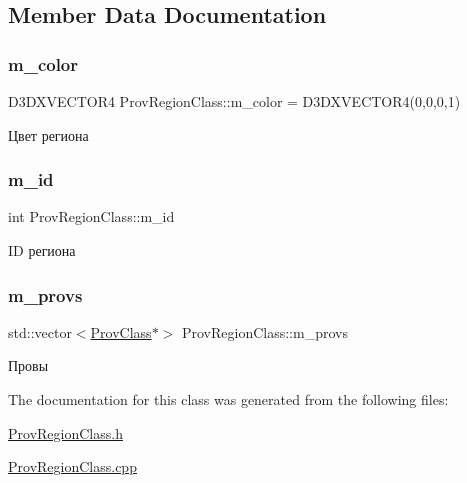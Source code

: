 \subsection{Member Data Documentation}
\mbox{\label{class_prov_region_class_a8782e9c8135dbf5f89f0b0b64649a129}} 
\subsubsection{\texorpdfstring{m\+\_\+color}{m\_color}}
{\footnotesize\ttfamily D3\+D\+X\+V\+E\+C\+T\+O\+R4 Prov\+Region\+Class\+::m\+\_\+color = D3\+D\+X\+V\+E\+C\+T\+O\+R4(0,0,0,1)\hspace{0.3cm}{\ttfamily [protected]}}



Цвет региона 

\mbox{\label{class_prov_region_class_a507b91b7ae0374d4e4b0816dc3dc0c62}} 
\subsubsection{\texorpdfstring{m\+\_\+id}{m\_id}}
{\footnotesize\ttfamily int Prov\+Region\+Class\+::m\+\_\+id\hspace{0.3cm}{\ttfamily [protected]}}



ID региона 

\mbox{\label{class_prov_region_class_a2597561e1bac7e8514c57e9db3620e17}} 
\subsubsection{\texorpdfstring{m\+\_\+provs}{m\_provs}}
{\footnotesize\ttfamily std\+::vector$<$\hyperlink{class_prov_class}{Prov\+Class}$\ast$$>$ Prov\+Region\+Class\+::m\+\_\+provs\hspace{0.3cm}{\ttfamily [protected]}}



Провы 



The documentation for this class was generated from the following files\+:\begin{DoxyCompactItemize}
\item 
\hyperlink{_prov_region_class_8h}{Prov\+Region\+Class.\+h}\item 
\hyperlink{_prov_region_class_8cpp}{Prov\+Region\+Class.\+cpp}\end{DoxyCompactItemize}
